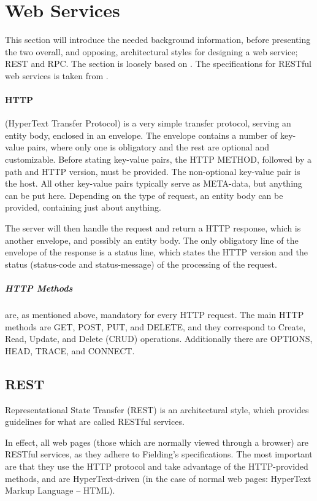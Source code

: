 \section{Web Services}
This section will introduce the needed background information, before presenting the two overall, and opposing, architectural styles for designing a web service; REST and RPC.
The section is loosely based on \citet{restful_web_services}.
The specifications for RESTful web services is taken from \citet{fielding_dissertation}.

\paragraph{HTTP\cite{http_specification}} (HyperText Transfer Protocol) is a very simple transfer protocol, serving an entity body, enclosed in an envelope.
The envelope contains a number of key-value pairs, where only one is obligatory and the rest are optional and customizable.
Before stating key-value pairs, the HTTP METHOD, followed by a path and HTTP version, must be provided.
The non-optional key-value pair is the host.
All other key-value pairs typically serve as META-data, but anything can be put here.
Depending on the type of request, an entity body can be provided, containing just about anything.

The server will then handle the request and return a HTTP response, which is another envelope, and possibly an entity body.
The only obligatory line of the envelope of the response is a status line, which states the HTTP version and the status (status-code and status-message) of the processing of the request.

\subparagraph{HTTP Methods} are, as mentioned above, mandatory for every HTTP request.
The main HTTP methods are GET, POST, PUT, and DELETE, and they correspond to Create, Read, Update, and Delete (CRUD) operations.
Additionally there are OPTIONS, HEAD, TRACE, and CONNECT.

\subsection{REST}
Representational State Transfer (REST) is an architectural style, which provides guidelines for what are called RESTful services.

In effect, all web pages (those which are normally viewed through a browser) are RESTful services, as they adhere to Fielding's specifications.
The most important are that they use the HTTP protocol and take advantage of the HTTP-provided methods, and are HyperText-driven (in the case of normal web pages: HyperText Markup Language -- HTML).

